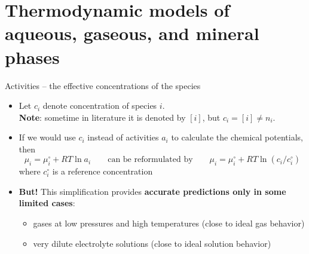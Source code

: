 \section{Thermodynamic models of aqueous, gaseous, and mineral phases}
%
%
\begin{frame}{Activities -- the effective concentrations of the species}
\begin{itemize}
\item Let $c_{i}$ denote concentration of species $i$. \\
\textbf{Note}: sometime in literature it is denoted by $[i]$, 
but $c_i = [i] \neq n_i$.
\pause
\item If we would use $c_{i}$ instead of activities $a_{i}$ to calculate the chemical potentials, then
\[
\mu_{i}=\mu_{i}^{\circ}+RT\ln a_{i} \qquad\text{can be reformulated by} \qquad \mu_{i}=\mu_{i}^{\circ}+RT\ln(c_{i}/c_{i}^{\circ})
\]
where $c_{i}^{\circ}$ is a reference concentration
%
\pause
\item \alert{\textbf{But!}} This simplification provides \textbf{accurate predictions only in some limited cases}:
%
\begin{itemize}
\item gases at low pressures and high temperatures \alert{(close to ideal gas behavior)}
\item very dilute electrolyte solutions \alert{(close to ideal solution behavior)}
\end{itemize}
\end{itemize}
\end{frame}
%
%
